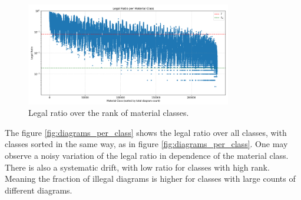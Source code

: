 \documentclass[12pt]{article}
\begin{document}
\begin{figure}[h!]
  \centering
  \includegraphics[width=0.8\textwidth]{valid_ratio_per_class.png}
  \caption{Legal ratio over the rank of material classes.}
  \label{fig:legal_ratio_by_class}
\end{figure}

The figure \ref{fig:diagrams_per_class} shows the legal ratio over all classes, with classes sorted in the same way, as in figure \ref{fig:diagrams_per_class}. One may observe a noisy variation of the legal ratio in dependence of the material class. There is also a systematic drift, with low ratio for classes with high rank. Meaning the fraction of illegal diagrams is higher for classes with large counts of different diagrams.
\end{document}
